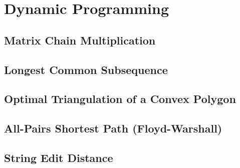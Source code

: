 \chapter{Dynamic Programming}

\section{Matrix Chain Multiplication}

\section{Longest Common Subsequence}

\section{Optimal Triangulation of a Convex Polygon}

\section{All-Pairs Shortest Path (Floyd-Warshall)}

\section{String Edit Distance}


